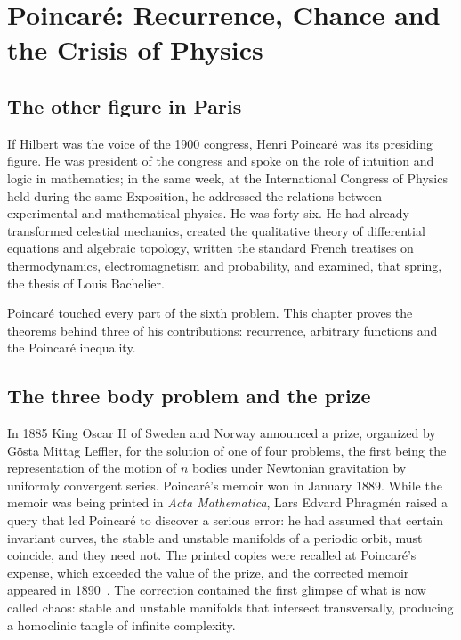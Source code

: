 \chapter{Poincar\'e: Recurrence, Chance and the Crisis of Physics}
\label{ch:poincare}

\section{The other figure in Paris}

If Hilbert was the voice of the 1900 congress, Henri Poincar\'e was its presiding figure. He was president of the congress and spoke on the role of intuition and logic in mathematics; in the same week, at the International Congress of Physics held during the same Exposition, he addressed the relations between experimental and mathematical physics. He was forty six. He had already transformed celestial mechanics, created the qualitative theory of differential equations and algebraic topology, written the standard French treatises on thermodynamics, electromagnetism and probability, and examined, that spring, the thesis of Louis Bachelier.

Poincar\'e touched every part of the sixth problem. This chapter proves the theorems behind three of his contributions: recurrence, arbitrary functions and the Poincar\'e inequality.

\section{The three body problem and the prize}

In 1885 King Oscar II of Sweden and Norway announced a prize, organized by G\"osta Mittag Leffler, for the solution of one of four problems, the first being the representation of the motion of $n$ bodies under Newtonian gravitation by uniformly convergent series. Poincar\'e's memoir won in January 1889. While the memoir was being printed in \emph{Acta Mathematica}, Lars Edvard Phragm\'en raised a query that led Poincar\'e to discover a serious error: he had assumed that certain invariant curves, the stable and unstable manifolds of a periodic orbit, must coincide, and they need not. The printed copies were recalled at Poincar\'e's expense, which exceeded the value of the prize, and the corrected memoir appeared in 1890~\cite{poincare1890}. The correction contained the first glimpse of what is now called chaos: stable and unstable manifolds that intersect transversally, producing a homoclinic tangle of infinite complexity.

